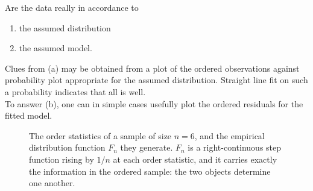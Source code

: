 \documentclass[12pt,a4paper]{report}
\theoremstyle{definition}
\theoremstyle{plain}
\begin{document}
Are the data really in accordance to
\begin{enumerate}
   \item[(a)] the assumed distribution
   \item[(b)] the assumed model.
\end{enumerate}
Clues from (a) may be obtained from a plot of the ordered observations against probability plot appropriate for the assumed distribution. Straight line fit on such a probability indicates that all is well.\\
To answer (b), one can in simple cases usefully plot the ordered residuals for the fitted model.





\begin{figure}[H]
\centering
{}
\caption{The order statistics of a sample of size $n=6$, and the empirical
distribution function $F_n$ they generate. $F_n$ is a right-continuous step
function rising by $1/n$ at each order statistic, and it carries exactly the
information in the ordered sample: the two objects determine one another.}
\label{fig:ecdf}
\end{figure}
\end{document}
